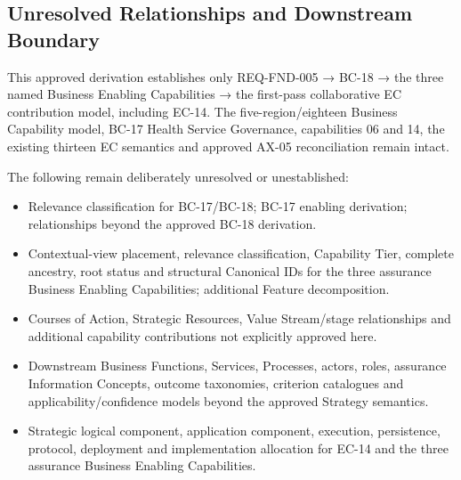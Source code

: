 \subsection*{Unresolved Relationships and Downstream Boundary}
\label{rad:assurance-strategy:90}

This approved derivation establishes only REQ-FND-005 → BC-18 → the three named Business Enabling Capabilities → the first-pass collaborative EC contribution model, including EC-14. The five-region/\allowbreak{}eighteen Business Capability model, BC-17 Health Service Governance, capabilities 06 and 14, the existing thirteen EC semantics and approved AX-05 reconciliation remain intact.

\label{rad:assurance-strategy:92}

The following remain deliberately unresolved or unestablished:

\label{rad:assurance-strategy:94}

\begin{itemize}

\item
Relevance classification for BC-17/\allowbreak{}BC-18; BC-17 enabling derivation; relationships beyond the approved BC-18 derivation.



\item
Contextual-view placement, relevance classification, Capability Tier, complete ancestry, root status and structural Canonical IDs for the three assurance Business Enabling Capabilities; additional Feature decomposition.



\item
Courses of Action, Strategic Resources, Value Stream/\allowbreak{}stage relationships and additional capability contributions not explicitly approved here.



\item
Downstream Business Functions, Services, Processes, actors, roles, assurance Information Concepts, outcome taxonomies, criterion catalogues and applicability/\allowbreak{}confidence models beyond the approved Strategy semantics.



\item
Strategic logical component, application component, execution, persistence, protocol, deployment and implementation allocation for EC-14 and the three assurance Business Enabling Capabilities.



\end{itemize}
\label{rad:assurance-strategy:100}

